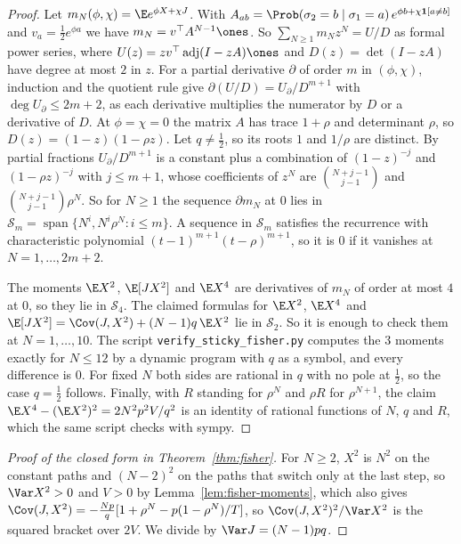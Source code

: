 \begin{proof}
Let $m_N(\phi,\chi)=\E e^{\phi X+\chi J}$. With
$A_{ab}=\Prob(\sigma_2=b\mid\sigma_1=a)\,e^{\phi b+\chi\mathbf 1[a\ne b]}$ and
$v_a=\frac12e^{\phi a}$ we have $m_N=v^\top A^{N-1}\ones$. So
$\sum_{N\ge1}m_Nz^N=U/D$ as formal power series, where
$U(z)=zv^\top\operatorname{adj}(I-zA)\ones$ and $D(z)=\det(I-zA)$ have degree
at most $2$ in $z$. For a partial derivative
$\partial$ of order $m$ in $(\phi,\chi)$, induction and the quotient rule give
$\partial(U/D)=U_\partial/D^{m+1}$ with $\deg U_\partial\le2m+2$, as each
derivative multiplies the numerator by $D$ or a derivative of $D$. At
$\phi=\chi=0$ the matrix $A$ has trace $1+\rho$ and determinant $\rho$, so
$D(z)=(1-z)(1-\rho z)$. Let $q\ne\frac12$, so its roots $1$ and
$1/\rho$ are distinct. By partial
fractions $U_\partial/D^{m+1}$ is a constant plus a combination of
$(1-z)^{-j}$ and $(1-\rho z)^{-j}$ with $j\le m+1$, whose coefficients of
$z^N$ are $\binom{N+j-1}{j-1}$ and $\binom{N+j-1}{j-1}\rho^N$. So for $N\ge1$
the sequence $\partial m_N$ at $0$ lies in
$\mathcal S_m=\operatorname{span}\{N^i,N^i\rho^N:i\le m\}$. A sequence in
$\mathcal S_m$ satisfies the recurrence with characteristic polynomial
$(t-1)^{m+1}(t-\rho)^{m+1}$, so it is $0$ if it vanishes at
$N=1,\dots,2m+2$.

The moments $\E X^2$, $\E[JX^2]$ and $\E X^4$ are derivatives of $m_N$ of
order at most $4$ at $0$, so they lie in $\mathcal S_4$. The claimed
formulas for $\E X^2$, $\E X^4$ and $\E[JX^2]=\Cov(J,X^2)+(N-1)q\,\E X^2$
lie in $\mathcal S_2$. So it is enough to check them at $N=1,\dots,10$. The
script \texttt{verify\_sticky\_fisher.py} computes the 3 moments exactly for
$N\le12$ by a dynamic program with $q$ as a symbol, and every difference is
$0$. For fixed $N$ both sides
are rational in $q$ with no pole at $\frac12$, so the case $q=\frac12$
follows. Finally, with $R$ standing for $\rho^N$ and $\rho R$ for
$\rho^{N+1}$, the claim $\E X^4-(\E X^2)^2=2N^2p^2V/q^2$ is an identity of
rational functions of $N$, $q$ and $R$, which the same script checks with
sympy.
\end{proof}

\begin{proof}[Proof of the closed form in Theorem~\ref{thm:fisher}]
For $N\ge2$, $X^2$ is $N^2$ on the constant paths and $(N-2)^2$ on the
paths that switch only at the last step, so $\Var X^2>0$ and $V>0$ by
Lemma~\ref{lem:fisher-moments}, which also gives
$\Cov(J,X^2)=-\frac{Np}q[1+\rho^N-p(1-\rho^N)/T]$, so
$\Cov(J,X^2)^2/\Var X^2$ is the squared bracket over $2V$. We divide by
$\Var J=(N-1)pq$.
\end{proof}

